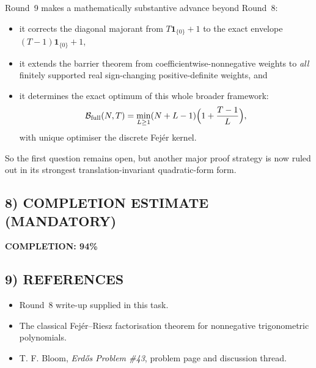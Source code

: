 Round~9 makes a mathematically substantive advance beyond Round~8:
\begin{itemize}
\item it corrects the diagonal majorant from \(T\mathbf 1_{\{0\}}+1\) to the exact envelope \((T-1)\mathbf 1_{\{0\}}+1\),
\item it extends the barrier theorem from coefficientwise-nonnegative weights to \emph{all} finitely supported real sign-changing positive-definite weights, and
\item it determines the exact optimum of this whole broader framework:
\[
\mathcal B_{\mathrm{full}}(N,T)
=
\min_{L\ge 1}(N+L-1)\Bigl(1+\frac{T-1}{L}\Bigr),
\]
with unique optimiser the discrete Fej\'er kernel.
\end{itemize}

So the first question remains open, but another major proof strategy is now ruled out in its strongest translation-invariant quadratic-form form.

\subsection{8) COMPLETION ESTIMATE (MANDATORY)}

\textbf{COMPLETION: 94\%}

\subsection{9) REFERENCES}

\begin{itemize}
\item Round~8 write-up supplied in this task.
\item The classical Fej\'er--Riesz factorisation theorem for nonnegative trigonometric polynomials.
\item T. F. Bloom, \emph{Erd\H{o}s Problem \#43}, problem page and discussion thread.
\end{itemize}

